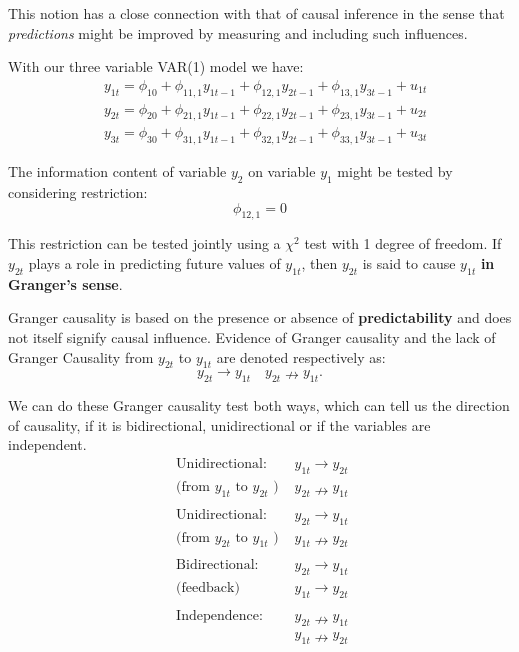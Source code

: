 \documentclass[11pt]{article}
\begin{document}
This notion has a close connection with that of causal inference in the sense that \textit{predictions} might be improved by measuring and including such influences.

With our three variable VAR(1) model we have:
\begin{equation}
\begin{aligned}
& y_{1 t}=\phi_{10}+\phi_{11,1} y_{1 t-1}+\phi_{12,1} y_{2 t-1}+\phi_{13,1} y_{3 t-1}+u_{1 t} \\
& y_{2 t}=\phi_{20}+\phi_{21,1} y_{1 t-1}+\phi_{22,1} y_{2 t-1}+\phi_{23,1} y_{3 t-1}+u_{2 t} \\
& y_{3 t}=\phi_{30}+\phi_{31,1} y_{1 t-1}+\phi_{32,1} y_{2 t-1}+\phi_{33,1} y_{3 t-1}+u_{3 t}
\end{aligned}
\end{equation}

The information content of variable $y_2$ on variable $y_1$ might be tested by considering restriction:
\[\phi_{12,1} = 0\]

This restriction can be tested jointly using a $\chi^2$ test with 1 degree of freedom. If $y_{2t}$ plays a role in predicting future values of $y_{1t}$, then $y_{2t}$ is said to cause $y_{1t}$ \textbf{in Granger's sense}.

\begin{note}
    Granger causality is based on the presence or absence of \textbf{predictability} and does not itself signify causal influence. Evidence of Granger causality and the lack of Granger Causality from $y_{2t}$ to $y_{1t}$ are denoted respectively as:
    \begin{equation}
y_{2 t} \rightarrow y_{1 t} \quad y_{2 t} \nrightarrow y_{1 t} .
\end{equation}
\end{note}

We can do these Granger causality test both ways, which can tell us the direction of causality, if it is bidirectional, unidirectional or if the variables are independent.
\begin{equation}
\begin{array}{ll}
\text { Unidirectional: } & y_{1 t} \rightarrow y_{2 t} \\
\text { (from } y_{1 t} \text { to } y_{2 t} \text { ) } & y_{2 t} \nrightarrow y_{1 t} \\
\\
\text { Unidirectional: } & y_{2 t} \rightarrow y_{1 t} \\
\text { (from } y_{2 t} \text { to } y_{1 t} \text { ) } & y_{1 t} \nrightarrow y_{2 t} \\
\\
\text { Bidirectional: } & y_{2 t} \rightarrow y_{1 t} \\
\text { (feedback) } & y_{1 t} \rightarrow y_{2 t} \\
\\
\text { Independence: } & y_{2 t} \nrightarrow y_{1 t} \\
& y_{1 t} \nrightarrow y_{2 t}
\end{array}
\end{equation}
\end{document}
